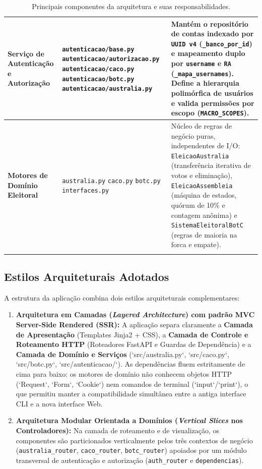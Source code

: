 \documentclass[12pt,a4paper]{article}
\begin{document}
\begin{longtable}[H]{|m{3.5cm}|m{6.5cm}|m{5cm}|}
\hline
\textbf{Serviço de Autenticação e Autorização} & \texttt{autenticacao/base.py} \newline \texttt{autenticacao/autorizacao.py} \newline \newline \texttt{autenticacao/caco.py autenticacao/botc.py autenticacao/australia.py} & Mantém o repositório de contas indexado por \texttt{UUID v4} (\texttt{\_banco\_por\_id}) e mapeamento duplo por \texttt{username} e \texttt{RA} (\texttt{\_mapa\_usernames}). Define a hierarquia polimórfica de usuários e valida permissões por escopo (\texttt{MACRO\_SCOPES}). \\
\hline
\textbf{Motores de Domínio Eleitoral} & \texttt{australia.py} \newline \texttt{caco.py} \newline \texttt{botc.py} \newline \texttt{interfaces.py} & Núcleo de regras de negócio puras, independentes de I/O: \texttt{EleicaoAustralia} (transferência iterativa de votos e eliminação), \texttt{EleicaoAssembleia} (máquina de estados, quórum de 10\% e contagem anônima) e \texttt{SistemaEleitoralBotC} (regras de maioria na forca e empate). \\
\hline
\caption{Principais componentes da arquitetura e suas responsabilidades.}
\label{tab:componentes}
\end{longtable}

\subsection{Estilos Arquiteturais Adotados}
A estrutura da aplicação combina dois estilos arquiteturais complementares:

\begin{enumerate}
    \item \textbf{Arquitetura em Camadas (\textit{Layered Architecture}) com padrão MVC Server-Side Rendered (SSR):} A aplicação separa claramente a \textbf{Camada de Apresentação} (Templates Jinja2 + CSS), a \textbf{Camada de Controle e Roteamento HTTP} (Roteadores FastAPI e Guardas de Dependência) e a \textbf{Camada de Domínio e Serviços} (`src/australia.py`, `src/caco.py`, `src/botc.py`, `src/autenticacao/`). As dependências fluem estritamente de cima para baixo: os motores de domínio não conhecem objetos HTTP (`Request`, `Form`, `Cookie`) nem comandos de terminal (`input`/`print`), o que permitiu manter a compatibilidade simultânea entre a antiga interface CLI e a nova interface Web.
    \item \textbf{Arquitetura Modular Orientada a Domínios (\textit{Vertical Slices} nos Controladores):} Na camada de roteamento e de visualização, os componentes são particionados verticalmente pelos três contextos de negócio (\texttt{australia\_router}, \texttt{caco\_router}, \texttt{botc\_router}) apoiados por um módulo transversal de autenticação e autorização (\texttt{auth\_router} e \texttt{dependencias}).
\end{enumerate}
\end{document}
